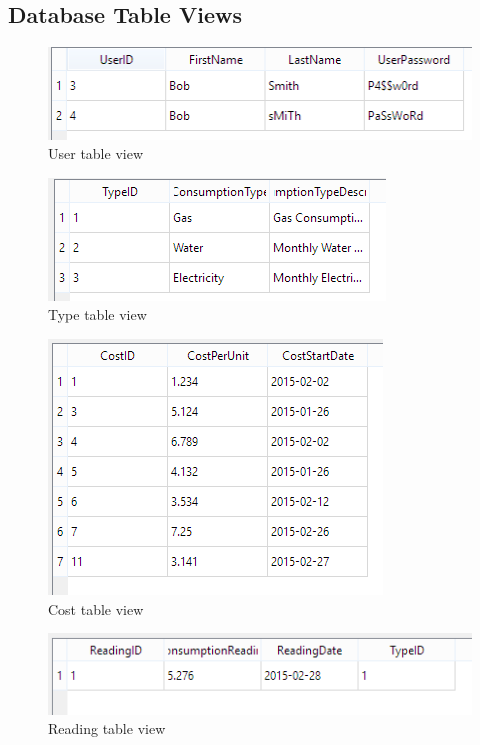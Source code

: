 \subsection{Database Table Views}
\begin{figure}[H]
	\includegraphics{./maintenance/images/User_Table_Entries.png}
	\caption{User table view}
\end{figure}

\begin{figure}[H]
	\includegraphics{./maintenance/images/Type_Table_Entries.png}
	\caption{Type table view}
\end{figure}

\begin{figure}[H]
	\includegraphics{./maintenance/images/Cost_Table_Entries.png}
	\caption{Cost table view}
\end{figure}

\begin{figure}[H]
	\includegraphics{./maintenance/images/Reading_Table_Entries.png}
	\caption{Reading table view}
\end{figure}

